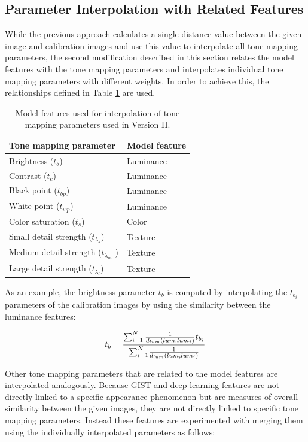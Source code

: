 \subsection{Parameter Interpolation with Related Features}
\label{sec:related_features}
While the previous approach calculates a single distance value between the given image and calibration images and use this value to interpolate all tone mapping parameters, the second modification described in this section relates the model features with the tone mapping parameters and interpolates individual tone mapping parameters with different weights. In order to achieve this, the relationships defined in Table \ref{tab:feature_mapping} are used.

\begin{table}
\caption{Model features used for interpolation of tone mapping parameters used in Version II.}
\centering
\begin{tabular}{l | l}
\label{tab:feature_mapping}
\textbf{Tone mapping parameter} & \textbf{Model feature}\\
\hline
Brightness ($t_b$) & Luminance \\
Contrast ($t_c$) & Luminance \\
Black point ($t_{bp}$) & Luminance \\
White point ($t_{wp}$) & Luminance \\
Color saturation ($t_s$) & Color \\
Small detail strength ($t_{\lambda_s}$) & Texture \\
Medium detail strength ($t_{\lambda_m}$ ) & Texture \\
Large detail strength ($t_{\lambda_l}$) & Texture
\end{tabular}
\end{table}


As an example, the brightness parameter $t_b$ is computed by interpolating the $t_{b_i}$ parameters of the calibration images by using the similarity between the luminance features:

\begin{equation}
   t_b = { {\sum_{i=1}^N { {1} \over {d_{lum} (lum, lum_i)} } t_{b_i} } \over {\sum_{i=1}^N} { {1} \over {d_{lum} (lum, lum_i)} } }
\end{equation}

Other tone mapping parameters that are related to the model features are interpolated analogously. Because GIST and deep learning features are not directly linked to a specific appearance phenomenon but are measures of overall similarity between the given images, they are not directly linked to specific tone mapping parameters. Instead these features are experimented with merging them using the individually interpolated parameters as follows: 

